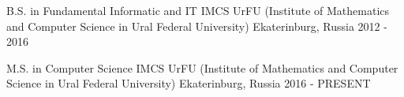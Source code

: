 


\begin{cventries}


\cventry
{B.S. in Fundamental Informatic and IT}
{IMCS UrFU \newline (Institute of Mathematics and Computer Science in Ural Federal University)}
{Ekaterinburg, Russia}
{2012 - 2016}
{ %
}

\cventry
{M.S. in Computer Science}
{IMCS UrFU \newline (Institute of Mathematics and Computer Science in Ural Federal University)}
{Ekaterinburg, Russia}
{2016 - PRESENT}
{ %
}


\end{cventries}
